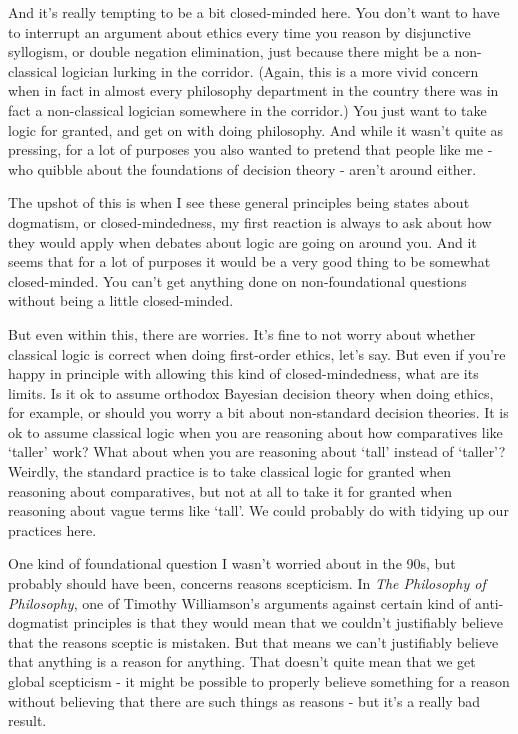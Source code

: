 \documentclass[
]{article}
\begin{document}
And it's really tempting to be a bit closed-minded here. You don't want
to have to interrupt an argument about ethics every time you reason by
disjunctive syllogism, or double negation elimination, just because
there might be a non-classical logician lurking in the corridor. (Again,
this is a more vivid concern when in fact in almost every philosophy
department in the country there was in fact a non-classical logician
somewhere in the corridor.) You just want to take logic for granted, and
get on with doing philosophy. And while it wasn't quite as pressing, for
a lot of purposes you also wanted to pretend that people like me - who
quibble about the foundations of decision theory - aren't around either.

The upshot of this is when I see these general principles being states
about dogmatism, or closed-mindedness, my first reaction is always to
ask about how they would apply when debates about logic are going on
around you. And it seems that for a lot of purposes it would be a very
good thing to be somewhat closed-minded. You can't get anything done on
non-foundational questions without being a little closed-minded.

But even within this, there are worries. It's fine to not worry about
whether classical logic is correct when doing first-order ethics, let's
say. But even if you're happy in principle with allowing this kind of
closed-mindedness, what are its limits. Is it ok to assume orthodox
Bayesian decision theory when doing ethics, for example, or should you
worry a bit about non-standard decision theories. It is ok to assume
classical logic when you are reasoning about how comparatives like
`taller' work? What about when you are reasoning about `tall' instead of
`taller'? Weirdly, the standard practice is to take classical logic for
granted when reasoning about comparatives, but not at all to take it for
granted when reasoning about vague terms like `tall'. We could probably
do with tidying up our practices here.

One kind of foundational question I wasn't worried about in the 90s, but
probably should have been, concerns reasons scepticism. In \emph{The
Philosophy of Philosophy}, one of Timothy Williamson's arguments against
certain kind of anti-dogmatist principles is that they would mean that
we couldn't justifiably believe that the reasons sceptic is mistaken.
But that means we can't justifiably believe that anything is a reason
for anything. That doesn't quite mean that we get global scepticism - it
might be possible to properly believe something for a reason without
believing that there are such things as reasons - but it's a really bad
result.
\end{document}
